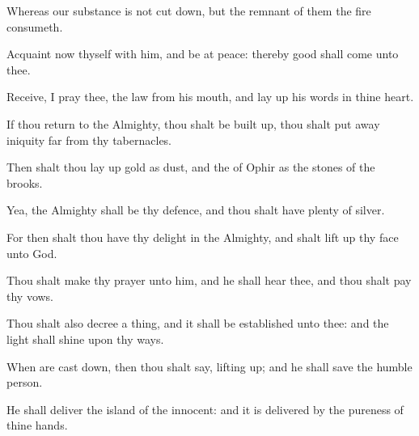 {Whereas our
substance is not cut
down, but the
remnant of them the
fire
consumeth.


\par }{\PP {}Acquaint now thyself with him, and be at
peace: thereby
good shall
come unto thee.

Receive, I pray thee, the
law from his
mouth, and lay
up his
words in thine
heart.

If thou
return to the
Almighty, thou shalt be built
up, thou shalt put
away
iniquity
far from thy
tabernacles.

Then shalt thou lay
up
gold
as
dust, and the
{} of
Ophir as the
stones of the
brooks.

Yea, the
Almighty shall be thy
defence, and thou shalt have
plenty of
silver.

For then shalt thou have thy
delight in the
Almighty, and shalt lift
up thy
face unto
God.

Thou shalt make thy
prayer unto him, and he shall
hear thee, and thou shalt
pay thy
vows.

Thou shalt also
decree a
thing, and it shall be
established unto thee: and the
light shall
shine upon thy
ways.

When
{} are cast
down, then thou shalt
say,
{} lifting
up; and he shall
save the
humble
person.

He shall
deliver the
island of the
innocent: and it is
delivered by the
pureness of thine
hands.




\par }
